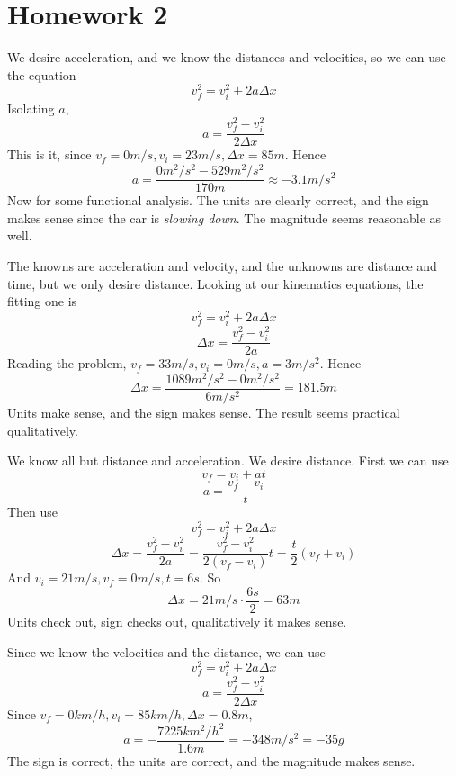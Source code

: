 \documentclass[11pt]{scrartcl}
\begin{document}
\section{Homework 2}
\begin{example}
  [Problem 22]
\end{example}
\begin{soln}
  We desire acceleration, and we know the distances and velocities, so we can use the equation
  $$v_f^2=v_i^2+2a\Delta x$$
  Isolating $a$,
  $$a=\frac{v_f^2-v_i^2}{2\Delta x}$$
  This is it, since $v_f=0m/s, v_i=23m/s, \Delta x=85m$. Hence
  $$a=\frac{0m^2/s^2-529m^2/s^2}{170m}\approx -3.1 m/s^2$$
  Now for some functional analysis. The units are clearly correct, and the
  sign makes sense since the car is \textit{slowing down}. The magnitude seems reasonable as well.
\end{soln}
\begin{example}
  [Problem 23]
\end{example}
\begin{soln}
  The knowns are acceleration and velocity, and the unknowns are distance and
  time, but we only desire distance. Looking at our kinematics equations,
  the fitting one is
  $$v_f^2=v_i^2+2a\Delta x$$
  $$\Delta x=\frac{v_f^2-v_i^2}{2a}$$
  Reading the problem, $v_f=33m/s, v_i=0m/s, a=3 m/s^2$. Hence
  $$\Delta x=\frac{1089 m^2/s^2-0m^2/s^2}{6 m/s^2}=181.5 m$$
  Units make sense, and the sign makes sense. The result seems practical
  qualitatively.
\end{soln}
\begin{example}
  [Problem 25]
\end{example}
\begin{soln}
  We know all but distance and acceleration. We desire distance.
  First we can use
  $$v_f=v_i+at$$
  $$a=\frac{v_f-v_i}{t}$$
  Then use
  $$v_f^2=v_i^2+2a\Delta x$$
  $$\Delta x=\frac{v_f^2-v_i^2}{2a}=\frac{v_f^2-v_i^2}{2(v_f-v_i)}t=\frac{t}{2}(v_f+v_i)$$
  And $v_i=21m/s, v_f=0m/s, t=6s$. So
  $$\Delta x=21m/s\cdot \frac{6s}{2}=63m$$
  Units check out, sign checks out, qualitatively it makes sense.
\end{soln}
\begin{example}
  [Problem 27]
\end{example}
\begin{soln}
  Since we know the velocities and the distance, we can use
  $$v_f^2=v_i^2+2a\Delta x$$
  $$a=\frac{v_f^2-v_i^2}{2\Delta x}$$
  Since $v_f=0km/h,  v_i=85km/h, \Delta x=0.8m$,
  $$a=-\frac{7225 km^2/h^2}{1.6m}=-348m/s^2=-35g$$
  The sign is correct, the units are correct, and the magnitude makes sense.
\end{soln}
\end{document}
